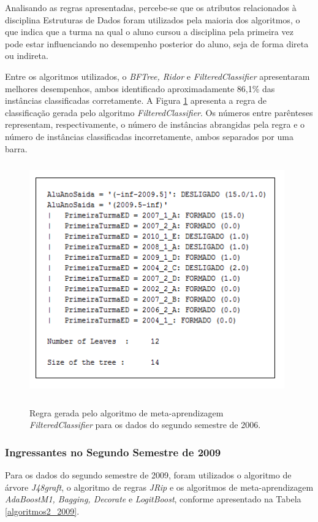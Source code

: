 Analisando as regras apresentadas, percebe-se que os atributos relacionados à disciplina Estruturas de Dados foram utilizados pela maioria dos algoritmos, o que indica que a turma na qual o aluno cursou a disciplina pela primeira vez pode estar influenciando no desempenho posterior do aluno, seja de forma direta ou indireta.

Entre os algoritmos utilizados, o \textit{BFTree, Ridor} e \textit{FilteredClassifier} apresentaram melhores desempenhos, ambos identificado aproximadamente 86,1\% das instâncias classificadas corretamente. A Figura \ref{regra2_2006} apresenta a regra de classificação gerada pelo algoritmo \textit{FilteredClassifier}. Os números entre parênteses representam, respectivamente, o número de instâncias abrangidas pela regra e o número de instâncias classificadas incorretamente, ambos separados por uma barra.

 \begin{figure}[!h]
 	\centering
 	{\includegraphics[width=11cm, height=10cm]{images/regra2_2006}}
 	\caption {Regra gerada pelo algoritmo de meta-aprendizagem \textit{FilteredClassifier} para os dados do segundo semestre de 2006.}
 	\label{regra2_2006}
 \end{figure}


\subsubsection{Ingressantes no Segundo Semestre de 2009}

Para os dados do segundo semestre de 2009, foram utilizados o algoritmo de árvore \textit{J48graft}, o algoritmo de regras \textit{JRip} e os algoritmos de meta-aprendizagem \textit{AdaBoostM1, Bagging, Decorate} e \textit{LogitBoost}, conforme apresentado na Tabela \ref{algoritmos2_2009}.

